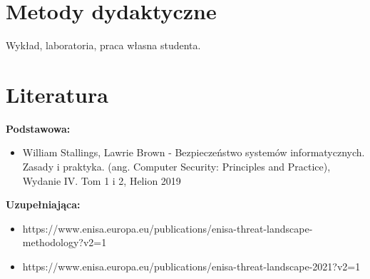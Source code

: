 \documentclass[12pt, a4paper]{article}
\begin{document}
\section{Metody dydaktyczne}

Wykład, laboratoria, praca własna studenta.

\section{Literatura}

\textbf{Podstawowa:}
\begin{itemize}
  \item William Stallings, Lawrie Brown - Bezpieczeństwo systemów informatycznych. Zasady i praktyka. (ang. Computer Security: Principles and Practice), Wydanie IV. Tom 1 i 2, Helion 2019
\end{itemize}

\textbf{Uzupełniająca:}
\begin{itemize}
  \item https://www.enisa.europa.eu/publications/enisa-threat-landscape-methodology?v2=1
  \item https://www.enisa.europa.eu/publications/enisa-threat-landscape-2021?v2=1
\end{itemize}
\end{document}
